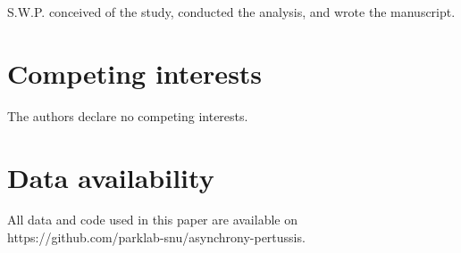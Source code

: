 \documentclass[12pt]{article}
\begin{document}
S.W.P. conceived of the study, conducted the analysis, and wrote the manuscript.

\section*{Competing interests}

The authors declare no competing interests.

\section*{Data availability}

All data and code used in this paper are available on https://github.com/parklab-snu/asynchrony-pertussis.


\pagebreak


\end{document}
